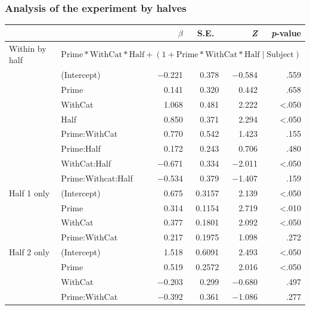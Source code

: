 \documentclass[noamssymb]{beamer}
\begin{document}
\begin{frame}
  \frametitle{{\ftf Analysis of the experiment by halves}}

  \begin{adjustbox}{width=1\textwidth,center=\textwidth}
    \begin{tabular}{llrrrr}
      \hline
      & & \(\beta\) & S.E.\ & \emph{Z} & \emph{p}-value  \\
      \hline
      Within by half & \multicolumn{5}{l}{\(\text{Prime} * \text{WithCat} * \text{Half} + (1 + \text{Prime} * \text{WithCat} * \text{Half} \mid \text{Subject})\)}  \\
      & (Intercept)        & \(-\)0.221 & 0.378 & \(-\)0.584 & .559 \\
      & Prime              &  0.141 & 0.320 &  0.442 & .658 \\
      & WithCat            &  1.068 & 0.481 &  2.222 & <.050 \\
      & Half               &  0.850 & 0.371 &  2.294 & <.050 \\
      & Prime:WithCat      &  0.770 & 0.542 &  1.423 & .155 \\
      & Prime:Half         &  0.172 & 0.243 &  0.706 & .480 \\
      & WithCat:Half       & \(-\)0.671 & 0.334 & \(-\)2.011 & <.050 \\
      & Prime:Withcat:Half & \(-\)0.534 & 0.379 & \(-\)1.407 & .159 \\
      Half 1 only & (Intercept)   & 0.675 & 0.3157 & 2.139 & <.050 \\
      & Prime         & 0.314 & 0.1154 & 2.719 & <.010 \\
      & WithCat       & 0.377 & 0.1801 & 2.092 & <.050 \\
      & Prime:WithCat & 0.217 & 0.1975 & 1.098 & .272 \\
      Half 2 only & (Intercept)   & 1.518 & 0.6091 & 2.493 & <.050 \\
      & Prime         & 0.519 & 0.2572 & 2.016 & <.050 \\
      & WithCat       & \(-\)0.203& 0.299 & \(-\)0.680& .497 \\
      & Prime:WithCat & \(-\)0.392& 0.361 & \(-\)1.086& .277 \\
      \hline
    \end{tabular}
  \end{adjustbox}
\end{frame}
\end{document}
